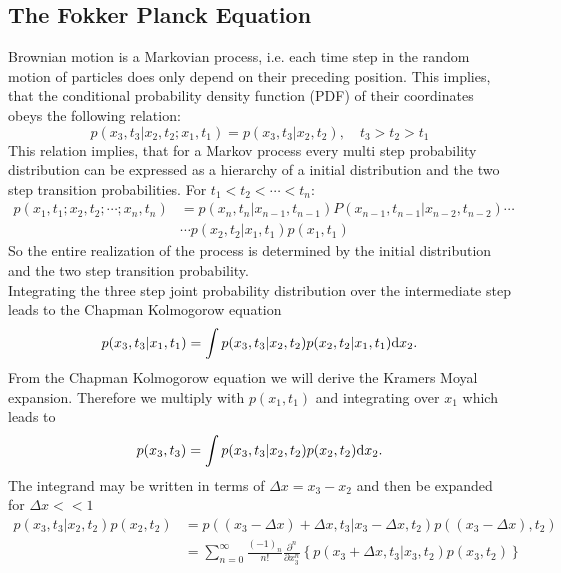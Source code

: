 \subsection{The Fokker Planck Equation}
\label{The_Fokker_Planck_Equation}
Brownian motion is a Markovian process, i.e. each time step in the random motion of particles does only depend on their preceding position. This implies, that the conditional probability density function (PDF) of their coordinates obeys the following relation:
\begin{equation}
    p(x_{3},t_{3}|x_{2},t_{2};x_{1},t_{1}) = p(x_{3},t_{3}|x_{2},t_{2}), \quad t_{3}>t_{2}>t_{1}
    \label{}
\end{equation}
This relation implies, that for a Markov process every multi step probability distribution can be expressed as a hierarchy of a initial distribution and the two step transition probabilities. For $ t_1 < t_2 < \cdots < t_n$:
\begin{align}
    p(x_1,t_1;x_2,t_2;\cdots;x_n,t_n) &= p(x_n,t_n|x_{n-1},t_{n-1})P(x_{n-1},t_{n-1}|x_{n-2},t_{n-2}) \cdots \nonumber \\
                                      & \cdots p(x_2,t_2|x_1,t_1)p(x_1,t_1)
    \label{hierarchy}
\end{align}
So the entire realization of the process is determined by the initial distribution and the two step transition probability. \\
Integrating the three step joint probability distribution over the intermediate step leads to the Chapman Kolmogorow equation
\begin{equation}
    p(x_3,t_3|x_1,t_1) = \int p(x_3,t_3|x_2,t_2) p(x_2,t_2|x_1,t_1) {\rm d} x_2.
    \label{Chapman Kolmogorov equation}
\end{equation}
From the Chapman Kolmogorow equation we will derive the Kramers Moyal expansion. Therefore we multiply  with $p(x_1,t_1)$ and integrating over $x_1$ which leads to
\begin{equation}
    p(x_3,t_3) = \int p(x_3,t_3|x_2,t_2)p(x_2,t_2) {\rm d} x_2.
    \label{ck3}
\end{equation}
The integrand may be written in terms of $\Delta x = x_3 - x_2$ and then be expanded for $\Delta x << 1$
\begin{align}
    p(x_3,t_3|x_2,t_2)p(x_2,t_2) &= p( (x_3 - \Delta x) + \Delta x, t_3|x_3 - \Delta x, t_2)p( (x_3 - \Delta x), t_2) \nonumber \\
    &= \sum_{n=0}^{\infty} \frac{(-1)_{n}}{n!}\frac{\partial^{n}}{\partial x_3^{n}}\left\{p(x_3 + \Delta x, t_3|x_3,t_2) p(x_3,t_2)\right\}
\end{align}
